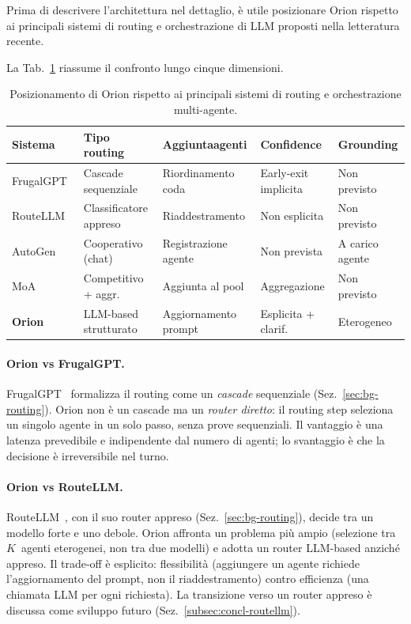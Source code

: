 Prima di descrivere l'architettura nel dettaglio, è utile posizionare Orion rispetto ai principali sistemi di routing
e orchestrazione di LLM proposti nella letteratura recente.

La Tab.~\ref{tab:orion-related} riassume il confronto lungo cinque dimensioni.

\begin{table}[htbp]
  \centering
  \caption[Confronto con i lavori correlati]{Posizionamento di Orion rispetto ai principali sistemi di routing e orchestrazione multi-agente.}
  \label{tab:orion-related}
  \small
  \begin{tabular}{p{2.4cm}p{3cm}p{2.8cm}p{2.3cm}p{2.3cm}}
    \toprule
    \textbf{Sistema}   & \textbf{Tipo routing} & \textbf{Aggiunta\newline agenti} & \textbf{Confidence} & \textbf{Grounding} \\
    \midrule
    FrugalGPT~\cite{chen2023frugalgpt}
        & Cascade sequenziale    & Riordinamento coda  & Early-exit implicita  & Non previsto \\
    RouteLLM~\cite{ong2024routellm}
        & Classificatore appreso & Riaddestramento     & Non esplicita         & Non previsto \\
    AutoGen~\cite{wu2023autogen}
        & Cooperativo (chat)     & Registrazione agente & Non prevista         & A carico agente \\
    MoA~\cite{wang2024moa}
        & Competitivo + aggr.    & Aggiunta al pool    & Aggregazione          & Non previsto \\
    \textbf{Orion}
        & LLM-based strutturato  & Aggiornamento prompt & Esplicita + clarif.  & Eterogeneo \\
    \bottomrule
  \end{tabular}
\end{table}

\paragraph{Orion vs FrugalGPT.} FrugalGPT~\cite{chen2023frugalgpt}
formalizza il routing come un \emph{cascade} sequenziale (Sez.~\ref{sec:bg-routing}).
Orion non è un cascade ma un \emph{router diretto}: il routing step seleziona un singolo agente in un solo passo, senza prove sequenziali.
Il vantaggio è una latenza prevedibile e indipendente dal numero di agenti; lo svantaggio è che la decisione è irreversibile nel turno.

\paragraph{Orion vs RouteLLM.} RouteLLM~\cite{ong2024routellm}, con il suo router appreso (Sez.~\ref{sec:bg-routing}), decide tra un modello forte e uno debole.
Orion affronta un problema più ampio (selezione tra $K$~agenti eterogenei,
non tra due modelli) e adotta un router LLM-based anziché appreso. Il trade-off è esplicito:
flessibilità (aggiungere un agente richiede l'aggiornamento del prompt, non il riaddestramento)
contro efficienza (una chiamata LLM per ogni richiesta).
La transizione verso un router appreso è discussa come sviluppo futuro (Sez.~\ref{subsec:concl-routellm}).

